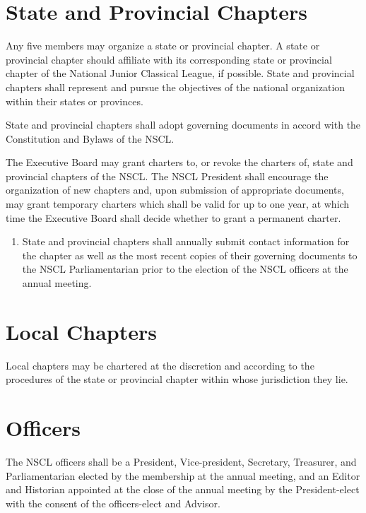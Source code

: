 \documentclass{bylaws}
\newcommand{\NSCL}{\textsc{NSCL}\xspace}
\begin{document}
\begin{linenumbers}[1]

  \section{State and Provincial Chapters}
  Any five members may organize a state or provincial chapter. A state
  or provincial chapter should affiliate with its corresponding state or
  provincial chapter of the National Junior Classical League, if
  possible. State and provincial chapters shall represent and pursue the
  objectives of the national organization within their states or
  provinces.
  \begin{enumerate}
     State and provincial chapters shall adopt
    governing documents in accord with the Constitution and Bylaws of
    the \NSCL.
    
    \sub[Charters] The Executive Board may grant charters to, or revoke
    the charters of, state and provincial chapters of the \NSCL. The
    \NSCL President shall encourage the organization of new chapters
    and, upon submission of appropriate documents, may grant temporary
    charters which shall be valid for up to one year, at which time the
    Executive Board shall decide whether to grant a permanent charter.
    \begin{enumerate}
    \item State and provincial chapters shall annually submit contact
      information for the chapter as well as the most recent copies of
      their governing documents to the \NSCL Parliamentarian prior to
      the election of the \NSCL officers at the annual meeting.\\
    \end{enumerate}
  \end{enumerate}

  \section{Local Chapters}
  Local chapters may be chartered at the discretion and according to the
  procedures of the state or provincial chapter within whose
  jurisdiction they lie.\\

  
  \section{Officers}
  The \NSCL officers shall be a President, Vice-president, Secretary,
  Treasurer, and Parliamentarian elected by the membership at the annual
  meeting, and an Editor and Historian appointed at the close of the
  annual meeting by the President-elect with the consent of the
  officers-elect and Advisor.\\


\end{linenumbers}
\end{document}
